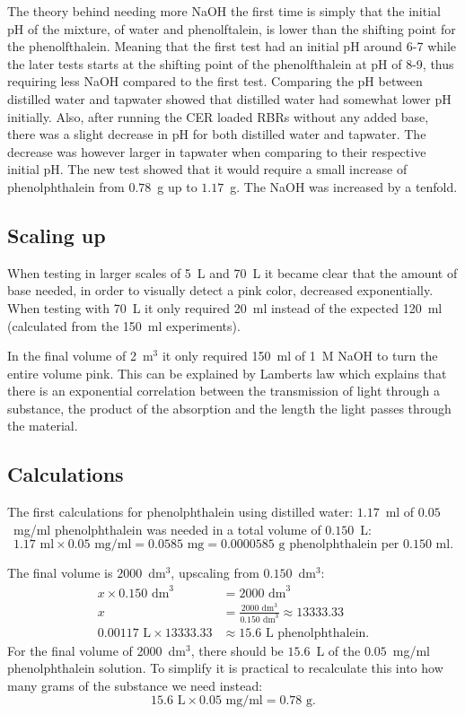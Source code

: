 The theory behind needing more NaOH the first time is simply that the initial pH of the mixture, of water and phenolftalein, is lower than the shifting point for the phenolfthalein. Meaning that the first test had an initial pH around 6-7 while the later tests starts at the shifting point of the phenolfthalein at pH of 8-9, thus requiring less NaOH compared to the first test.
Comparing the pH between distilled water and tapwater showed that distilled water had somewhat lower pH initially. Also, after running the CER loaded RBRs without any added base, there was a slight decrease in pH for both distilled water and tapwater. The decrease was however larger in tapwater when comparing to their respective initial pH.
The new test showed that it would require a small increase of phenolphthalein from $0.78$~g up to $1.17$~g. The NaOH was increased by a tenfold.

\subsection{Scaling up}
When testing in larger scales of 5~L and 70~L it became clear that the amount of base needed, in order to visually detect a pink color, decreased exponentially. When testing with 70~L it only required 20~ml instead of the expected 120~ml (calculated from the 150~ml experiments).

In the final volume of 2~m$^3$ it only required 150~ml of 1~M NaOH to turn the entire volume pink. This can be explained by Lamberts law which explains that there is an exponential correlation between the transmission of light through a substance, the product of the absorption and the length the light passes through the material.\cite{pierre}

\subsection{Calculations}\label{sec:calculations}
The first calculations for phenolphthalein using distilled water:
$1.17$~ml of $0.05$~mg/ml phenolphthalein was needed in a total volume of $0.150$~L:
\begin{equation}\label{eq:concentration}
    1.17 \text{ ml} \times 0.05 \text{ mg/ml}
    = 0.0585 \text{ mg} = 0.0000585 \text{ g} \text{ phenolphthalein per } 0.150 \text{ ml}.
\end{equation}

The final volume is $2000$~dm$^3$, upscaling from $0.150$~dm$^3$:
\begin{align}
x \times 0.150 \text{ dm}^3 &= 2000 \text{ dm}^3 \nonumber \\
x &= \frac{2000 \text{ dm}^3}{0.150 \text{ dm}^3} \approx 13333.33 \\
0.00117 \text{ L} \times 13333.33 &\approx 15.6 \text{ L phenolphthalein.} 
\end{align}
For the final volume of 2000~dm$^3$, there should be $15.6$~L of the $0.05$~mg/ml phenolphthalein solution.
To simplify it is practical to recalculate this into how many grams of the substance we need instead:
\begin{equation}
    15.6 \text{ L} \times 0.05 \text{ mg/ml} = 0.78 \text{ g}.
\end{equation}

